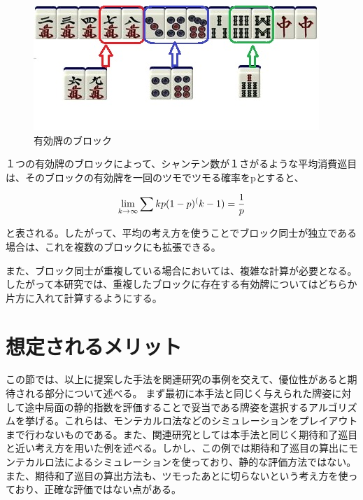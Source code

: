 \begin{figure}[h]
 \centering
 \includegraphics[keepaspectratio, scale=1,bb=0 0 320 194]
      {img/block.jpg}
 \caption{有効牌のブロック}
 \label{block}
\end{figure}

１つの有効牌のブロックによって、シャンテン数が１さがるような平均消費巡目は、そのブロックの有効牌を一回のツモでツモる確率をpとすると、

\begin{equation}
\label{kitai1}
\Large \lim _{k\rightarrow \infty }\sum { kp(1-p)^(k-1)} = \displaystyle \frac{1}{p}
\end{equation}

と表される。したがって、平均の考え方を使うことでブロック同士が独立である場合は、これを複数のブロックにも拡張できる。

また、ブロック同士が重複している場合においては、複雑な計算が必要となる。したがって本研究では、重複したブロックに存在する有効牌についてはどちらか片方に入れて計算するようにする。











\section{想定されるメリット}
この節では、以上に提案した手法を関連研究の事例を交えて、優位性があると期待される部分について述べる。
まず最初に本手法と同じく与えられた牌姿に対して途中局面の静的指数を評価することで妥当である牌姿を選択するアルゴリズムを挙げる。これらは、モンテカルロ法などのシミュレーションをプレイアウトまで行わないものである。また、関連研究としては本手法と同じく期待和了巡目と近い考え方を用いた例を述べる。しかし、この例では期待和了巡目の算出にモンテカルロ法によるシミュレーションを使っており、静的な評価方法ではない。また、期待和了巡目の算出方法も、ツモったあとに切らないという考え方を使っており、正確な評価ではない点がある。


